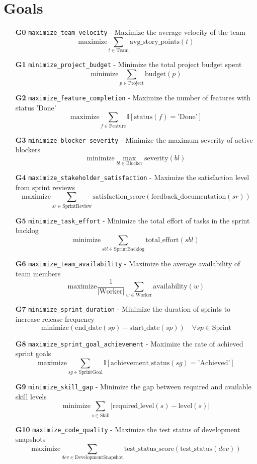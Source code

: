 \documentclass[11pt]{article}
\begin{document}
\section{Goals}
\begin{itemize}
    \item[\textbf{G0}] \texttt{maximize\_team\_velocity} - Maximize the average velocity of the team
        \[ \text{maximize} \sum_{t \in \text{Team}} \text{avg\_story\_points}(t) \]
    \item[\textbf{G1}] \texttt{minimize\_project\_budget} - Minimize the total project budget spent
        \[ \text{minimize} \sum_{p \in \text{Project}} \text{budget}(p) \]
    \item[\textbf{G2}] \texttt{maximize\_feature\_completion} - Maximize the number of features with status 'Done'
        \[ \text{maximize} \sum_{f \in \text{Feature}} \mathbb{I}[\text{status}(f) = \text{'Done'}] \]
    \item[\textbf{G3}] \texttt{minimize\_blocker\_severity} - Minimize the maximum severity of active blockers
        \[ \text{minimize} \max_{bl \in \text{Blocker}} \text{severity}(bl) \]
    \item[\textbf{G4}] \texttt{maximize\_stakeholder\_satisfaction} - Maximize the satisfaction level from sprint reviews
        \[ \text{maximize} \sum_{sr \in \text{SprintReview}} \text{satisfaction\_score}(\text{feedback\_documentation}(sr)) \]
    \item[\textbf{G5}] \texttt{minimize\_task\_effort} - Minimize the total effort of tasks in the sprint backlog
        \[ \text{minimize} \sum_{sbl \in \text{SprintBacklog}} \text{total\_effort}(sbl) \]
    \item[\textbf{G6}] \texttt{maximize\_team\_availability} - Maximize the average availability of team members
        \[ \text{maximize} \frac{1}{|\text{Worker}|} \sum_{w \in \text{Worker}} \text{availability}(w) \]
    \item[\textbf{G7}] \texttt{minimize\_sprint\_duration} - Minimize the duration of sprints to increase release frequency
        \[ \text{minimize} (\text{end\_date}(sp) - \text{start\_date}(sp)) \quad \forall sp \in \text{Sprint} \]
    \item[\textbf{G8}] \texttt{maximize\_sprint\_goal\_achievement} - Maximize the rate of achieved sprint goals
        \[ \text{maximize} \sum_{sg \in \text{SprintGoal}} \mathbb{I}[\text{achievement\_status}(sg) = \text{'Achieved'}] \]
    \item[\textbf{G9}] \texttt{minimize\_skill\_gap} - Minimize the gap between required and available skill levels
        \[ \text{minimize} \sum_{s \in \text{Skill}} |\text{required\_level}(s) - \text{level}(s)| \]
    \item[\textbf{G10}] \texttt{maximize\_code\_quality} - Maximize the test status of development snapshots
        \[ \text{maximize} \sum_{dev \in \text{DevelopmentSnapshot}} \text{test\_status\_score}(\text{test\_status}(dev)) \]
\end{itemize}
\end{document}
